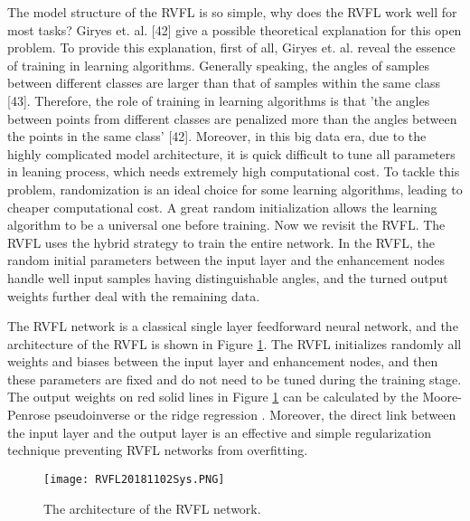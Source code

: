 The model structure of the RVFL is so simple, why does the RVFL work well for most tasks? Giryes et. al. [42] give
a possible theoretical explanation for this open problem. To
provide this explanation, first of all, Giryes et. al. reveal the
essence of training in learning algorithms. Generally speaking,
the angles of samples between different classes are larger than
that of samples within the same class [43]. Therefore, the role
of training in learning algorithms is that ’the angles between
points from different classes are penalized more than the
angles between the points in the same class’ [42]. Moreover,
in this big data era, due to the highly complicated model architecture, it is quick difficult to tune all parameters in leaning
process, which needs extremely high computational cost. To
tackle this problem, randomization is an ideal choice for some
learning algorithms, leading to cheaper computational cost. A
great random initialization allows the learning algorithm to be
a universal one before training. Now we revisit the RVFL. The
RVFL uses the hybrid strategy to train the entire network. In
the RVFL, the random initial parameters between the input
layer and the enhancement nodes handle well input samples
having distinguishable angles, and the turned output weights
further deal with the remaining data.

The RVFL network is a classical single layer feedforward neural network, and the architecture of the RVFL is shown in Figure \ref{RVFLNN181102Sys}. The RVFL initializes randomly all weights and biases between the input layer and enhancement nodes, and then these parameters are fixed and do not need to be tuned during the training stage. The output weights on red solid lines in Figure \ref{RVFLNN181102Sys} can be calculated by the Moore-Penrose pseudoinverse \cite{PaoPhillips1995-6471,IgelnikPao1995-6470} or the ridge regression \cite{Bishop2012-6469}. Moreover, the direct link between the input layer and the output layer is an effective and simple regularization technique preventing RVFL networks from overfitting.
\begin{figure}[tb]
\centering
  \texttt{[image: RVFL20181102Sys.PNG]}
  \caption{The architecture of the RVFL network.}
  \label{RVFLNN181102Sys}
\end{figure}

